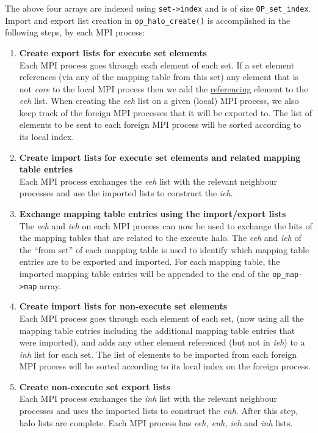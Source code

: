 \documentclass[11pt]{article}
\begin{document}
\noindent The above four arrays are indexed using \texttt{set->index} and is of
size \texttt{OP\_set\_index}. Import and export list creation in
\texttt{op\_halo\_create()} is accomplished in the following steps, by each MPI
process:
\begin{enumerate}
\item \textbf{Create export lists for execute set elements}\\
Each MPI process goes through each element of each set. If a set element
references (via any of the mapping table from this set) any element that is not
\textit{core} to the local MPI process then we add the \underline{referencing}
element to the \textit{eeh} list. When creating the \textit{eeh} list on a given
(local) MPI process, we also keep track of the foreign MPI processes that it
will be exported to. The list of elements to be sent to each foreign MPI process
will be sorted according to its local index.

\item \textbf{Create import lists for execute set elements and related mapping
table entries}\\
Each MPI process exchanges the \textit{eeh} list with the relevant neighbour
processes and use the imported lists to construct the \textit{ieh}.

\item \textbf{Exchange mapping table entries using the import/export lists}\\
The \textit{eeh} and \textit{ieh} on each MPI process can now be used to
exchange the bits of the mapping tables that are related to the execute halo.
The \textit{eeh} and \textit{ieh} of the ``from set'' of each mapping table is
used to identify which mapping table entries are to be exported and imported.
For each mapping table, the imported mapping table entries will be appended to
the end of the \texttt{op\_map->map} array.

\item \textbf{Create import lists for non-execute set elements }\\
Each MPI process goes through each element of each set, (now using all the
mapping table entries including the additional mapping table entries that were
imported), and adds any other element referenced (but not in \textit{ieh}) to a
\textit{inh} list for each set. The list of elements to be imported from each
foreign MPI process will be sorted according to its local index on the foreign
process.

\item \textbf{Create non-execute set export lists}\\
Each MPI process exchanges the \textit{inh} list with the relevant neighbour
processes and uses the imported lists to construct the \textit{enh}. After this
step, halo lists are complete. Each MPI process has \textit{eeh, enh, ieh} and
\textit{inh} lists.


\end{enumerate}
\end{document}
